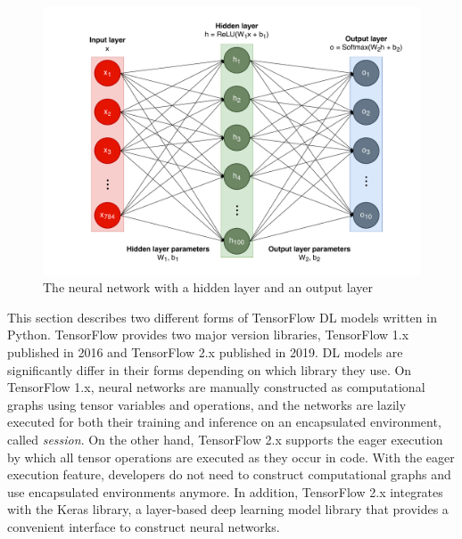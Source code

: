 \begin{figure}[ht!]
\includegraphics[width=\textwidth]{mnist_model.pdf}
  \caption{The neural network with a hidden layer and an output layer}
\label{fig:back:model}
\end{figure}

This section describes two different forms of TensorFlow DL models written in
Python.
TensorFlow provides two major version libraries, TensorFlow 1.x published in
2016 and TensorFlow 2.x published in 2019. 
DL models are significantly differ in their forms depending on which library
they use. 
On TensorFlow 1.x, neural networks are manually constructed as computational
graphs using tensor variables and operations, and the networks are lazily
executed for both their training and inference on an encapsulated environment,
called {\it session}.
On the other hand, TensorFlow 2.x supports the eager execution by which all
tensor operations are executed as they occur in code. 
With the eager execution feature, developers do not need to construct
computational graphs and use encapsulated environments anymore.
In addition, TensorFlow 2.x integrates with the Keras library, a layer-based
deep learning model library that provides a convenient interface to construct
neural networks.

